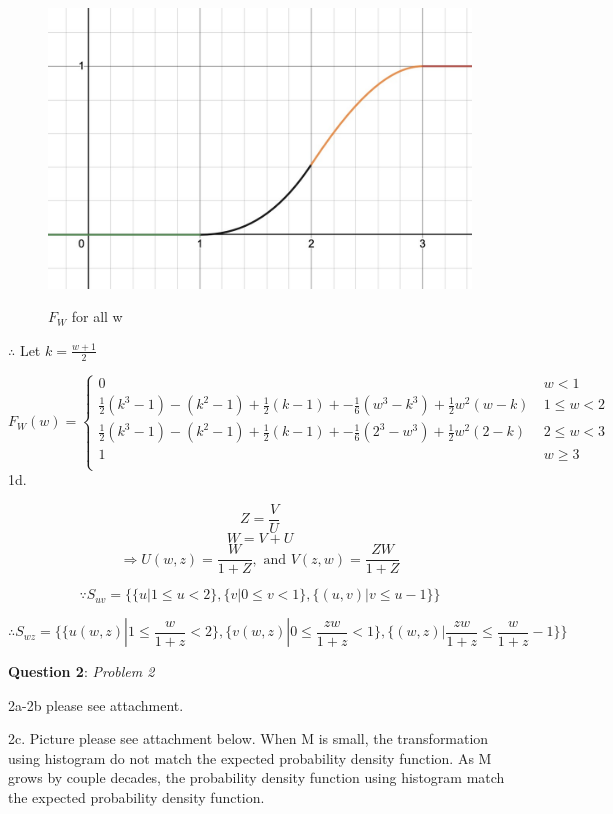 \documentclass{article} %
\newcommand{\question}[2][]{\begin{flushleft}
        \textbf{Question #1}: \textit{#2}

\end{flushleft}}
\begin{document}
    \begin{figure}[]
        \centering
        \includegraphics[scale=0.20]{HW/HW4/p1c_fw.jpg}
        \label{fig:$F_W,all$}
        \caption{$F_W$ for all w}    
    \end{figure}

    $\therefore$ Let $k=\frac{w+1}{2}$
    
    $F_W(w) = \left\{ \begin{array}{cl}
        0  &  \ w < 1 \\
        \frac{1}{2}(k^3-1)-(k^2-1)+\frac{1}{2}(k-1)+-\frac{1}{6}(w^3-k^3)+\frac{1}{2}w^2(w-k) &  \ 1 \leq w < 2 \\
        \frac{1}{2}(k^3-1)-(k^2-1)+\frac{1}{2}(k-1)+-\frac{1}{6}(2^3-w^3)+\frac{1}{2}w^2(2-k)  &  \ 2 \leq w < 3 \\
        1 &  \ w \geq 3 \\
        \end{array} \right.$
\newpage
    1d.

    $$Z = \frac{V}{U}$$
    $$W = V+U$$
    $$\Rightarrow U(w,z)=\frac{W}{1+Z}, \text{ and } V(z,w)=\frac{ZW}{1+Z}$$

    $$\because S_{uv}=\{{\{u| 1 \leq u < 2\},\{v| 0 \leq v < 1\},\{(u,v)| v \leq u-1 \}}\}$$

    $$\therefore S_{wz}=\{{\{u(w,z)| 1 \leq \frac{w}{1+z} < 2\},\{v(w,z)| 0 \leq \frac{zw}{1+z} < 1\},\{(w,z)| \frac{zw}{1+z} \leq \frac{w}{1+z}-1 \}}\}$$
    \question[2]{Problem 2}
    
    2a-2b please see attachment.

    2c. Picture please see attachment below. When M is small, the transformation using histogram do not match the expected probability density function. As M grows by couple decades, the probability density function using histogram match the expected probability density function.  
    
    
\end{document}
